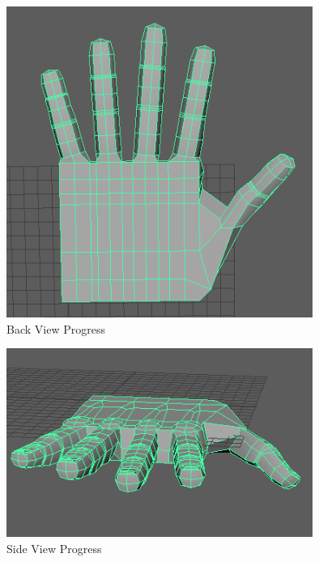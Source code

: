 \documentclass[a4paper]{article}
\begin{document}
\begin{figure}[h]
\centering
\includegraphics[width=10cm]{img/Back1.png}
\caption{Back View Progress}
\label{fig:Angle View}
\end{figure}


\begin{figure}[h]
\centering
\includegraphics[width=10cm]{img/Side1.png}
\caption{Side View Progress}
\label{fig:Side View}
\end{figure}
\end{document}
